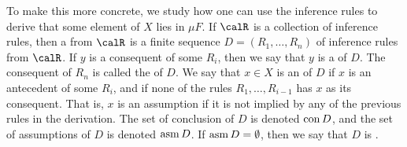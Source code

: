 \documentclass[a4paper, 11pt, article, danish, oneside]{memoir}
\begin{document}
To make this more concrete, we study how one can use the inference rules to derive that some element of $X$ lies in $\mu F$. If $\calR$ is a collection of inference rules, then a  from $\calR$ is a finite sequence $D = (R_1, \ldots, R_n)$ of inference rules from $\calR$. If $y$ is a consequent of some $R_i$, then we say that $y$ is a  of $D$. The consequent of $R_n$ is called the  of $D$. We say that $x \in X$ is an  of $D$ if $x$ is an antecedent of some $R_i$, and if none of the rules $R_1, \ldots, R_{i-1}$ has $x$ as its consequent. That is, $x$ is an assumption if it is not implied by any of the previous rules in the derivation. The set of conclusion of $D$ is denoted $\operatorname{con}D$, and the set of assumptions of $D$ is denoted $\operatorname{asm}D$. If $\operatorname{asm}D = \emptyset$, then we say that $D$ is .
\end{document}
